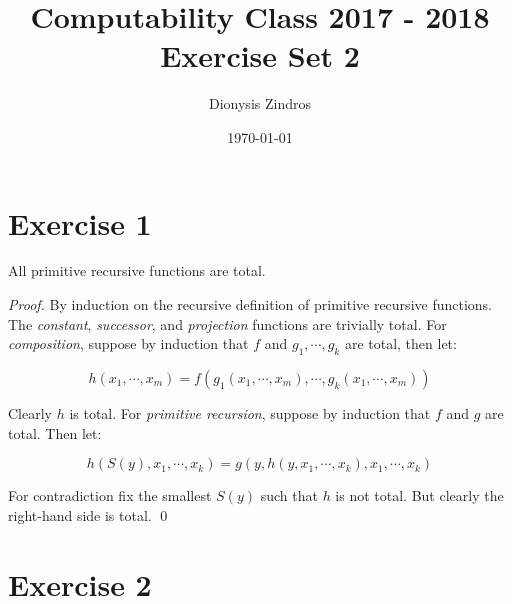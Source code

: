 \documentclass[11pt]{llncs}
\begin{document}
\title{
Computability Class 2017 - 2018\\
Exercise Set 2}
\date{\today}
\author{Dionysis Zindros\\
    }
\maketitle
\noindent
\makebox[\linewidth]{\small \today}

\thispagestyle{plain}

\section*{Exercise 1}
\begin{lemma}
All primitive recursive functions are total.
\end{lemma}
\begin{proof}
By induction on the recursive definition of primitive recursive functions. The
\textit{constant}, \textit{successor}, and \textit{projection} functions are trivially total. For
\textit{composition}, suppose by induction that $f$ and $g_1, \cdots, g_k$ are total,
then let:

\[
  h(x_1, \cdots, x_m) = f(g_1(x_1, \cdots, x_m), \cdots, g_k(x_1, \cdots,
x_m))
\]

Clearly $h$ is total. For \textit{primitive recursion}, suppose by induction that $f$ and
$g$ are total. Then let:

\[
  h(S(y), x_1, \cdots, x_k) = g(y, h(y, x_1, \cdots, x_k), x_1, \cdots, x_k)
\]

For contradiction fix the smallest $S(y)$ such that $h$ is not
total. But clearly the right-hand side is total.
\qed
\end{proof}

\section*{Exercise 2}
\end{document}
